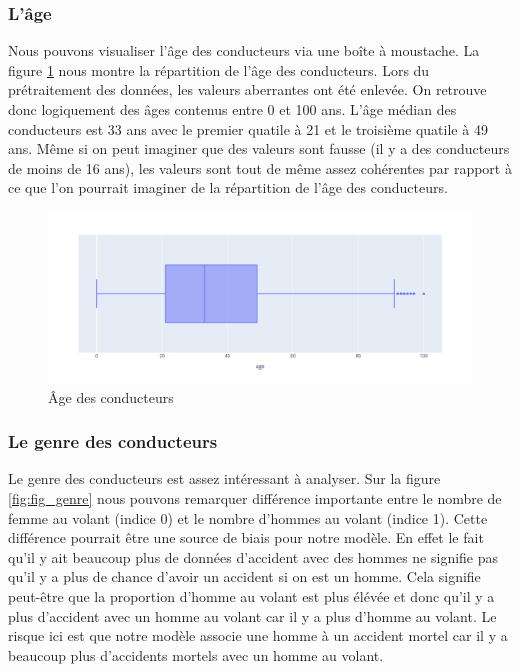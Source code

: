 \documentclass{article}
\begin{document}
    \subsubsection{L'âge}
    Nous pouvons visualiser l'âge des conducteurs via une boîte à moustache. La figure \ref{fig:fig_age} nous 
    montre la répartition de l'âge des conducteurs. Lors du prétraitement des données, les valeurs aberrantes 
    ont été enlevée. On retrouve donc logiquement des âges contenus entre 0 et 100 ans. L'âge médian des 
    conducteurs est 33 ans avec le premier quatile à 21 et le troisième quatile à 49 ans. Même si on peut 
    imaginer que des valeurs sont fausse (il y a des conducteurs de moins de 16 ans), les valeurs sont tout de 
    même assez cohérentes par rapport à ce que l'on pourrait imaginer de la répartition de l'âge des conducteurs.

    \begin{figure}[ht]
        \centering
        \includegraphics[width=12cm]{./img/age.png}
        \caption{Âge des conducteurs}
        \label{fig:fig_age}
    \end{figure}

    \subsubsection{Le genre des conducteurs}
    Le genre des conducteurs est assez intéressant à analyser. Sur la figure \ref{fig:fig_genre} nous pouvons 
    remarquer différence importante entre le nombre de femme au volant (indice 0) et le nombre d'hommes au volant 
    (indice 1). Cette différence pourrait être une source de biais pour notre modèle. En effet le fait qu'il y ait 
    beaucoup plus de données d'accident avec des hommes ne signifie pas qu'il y a plus de chance d'avoir un accident 
    si on est un homme. Cela signifie peut-être que la proportion d'homme au volant est plus élévée et donc qu'il 
    y a plus d'accident avec un homme au volant car il y a plus d'homme au volant. Le risque ici est que notre 
    modèle associe une homme à un accident mortel car il y a beaucoup plus d'accidents mortels avec un homme au 
    volant.
\end{document}
